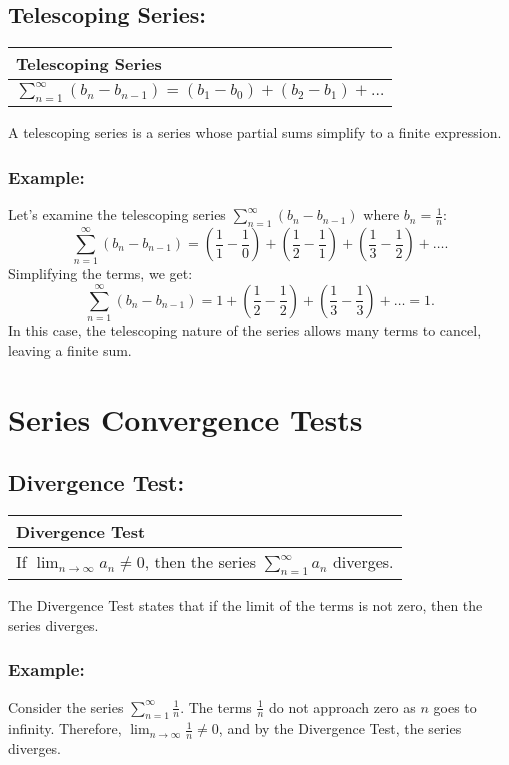 \documentclass[12pt]{article}
\newcommand{\formula}[2]{
    {\renewcommand{\arraystretch}{2}
        \begin{center}
        \begin{tabular}{|p{0.9\textwidth}|}
        \hline
        \textbf{#1} \\
        \hline
        #2 \\
        \hline
        \end{tabular}
        \end{center}
    }
}
\begin{document}
\vspace{\baselineskip}

\subsection{Telescoping Series: }
\formula{Telescoping Series}{
    $\sum_{n=1}^{\infty} (b_n - b_{n-1}) = (b_1 - b_0) + (b_2 - b_1) + \ldots$
}
A telescoping series is a series whose partial sums simplify to a finite expression.
\subsubsection{Example: }
Let's examine the telescoping series $\sum_{n=1}^{\infty} (b_n - b_{n-1})$ where $b_n = \frac{1}{n}$:
\[
\sum_{n=1}^{\infty} (b_n - b_{n-1}) = \left(\frac{1}{1} - \frac{1}{0}\right) + \left(\frac{1}{2} - \frac{1}{1}\right) + \left(\frac{1}{3} - \frac{1}{2}\right) + \ldots.
\]
Simplifying the terms, we get:
\[
\sum_{n=1}^{\infty} (b_n - b_{n-1}) = 1 + \left(\frac{1}{2} - \frac{1}{2}\right) + \left(\frac{1}{3} - \frac{1}{3}\right) + \ldots = 1.
\]
In this case, the telescoping nature of the series allows many terms to cancel, leaving a finite sum.

\vspace{\baselineskip}
\vspace{\baselineskip}

\section{Series Convergence Tests}

\subsection{Divergence Test: }
\formula{Divergence Test}{
    If $\lim_{n \to \infty} a_n \neq 0$, then the series $\sum_{n=1}^{\infty} a_n$ diverges.
}
The Divergence Test states that if the limit of the terms is not zero, then the series diverges.
\subsubsection{Example: }
Consider the series $\sum_{n=1}^{\infty} \frac{1}{n}$. The terms $\frac{1}{n}$ do not approach zero as $n$ goes to infinity. Therefore, $\lim_{n \to \infty} \frac{1}{n} \neq 0$, and by the Divergence Test, the series diverges.

\vspace{\baselineskip}
\end{document}
